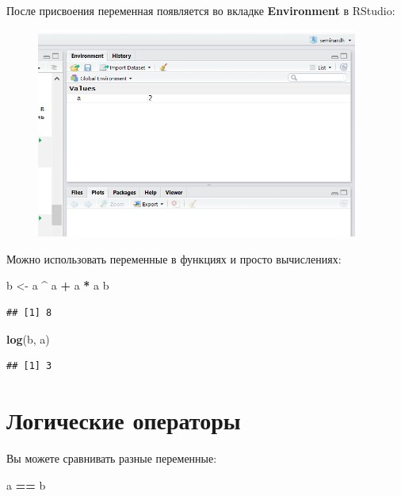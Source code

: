 \documentclass[]{book}
\newenvironment{Shaded}{\begin{snugshade}}{\end{snugshade}}
\newcommand{\KeywordTok}[1]{\textcolor[rgb]{0.13,0.29,0.53}{\textbf{#1}}}
\newcommand{\StringTok}[1]{\textcolor[rgb]{0.31,0.60,0.02}{#1}}
\newcommand{\OperatorTok}[1]{\textcolor[rgb]{0.81,0.36,0.00}{\textbf{#1}}}
\newcommand{\NormalTok}[1]{#1}
\begin{document}
После присвоения переменная появляется во вкладке \textbf{Environment} в
RStudio:

\begin{figure}
\centering
\includegraphics[width=4.16667in]{images/env.png}
\caption{}
\end{figure}

Можно использовать переменные в функциях и просто вычислениях:

\begin{Shaded}
\begin{Highlighting}[]
\NormalTok{b <-}\StringTok{ }\NormalTok{a }\OperatorTok{^}\StringTok{ }\NormalTok{a }\OperatorTok{+}\StringTok{ }\NormalTok{a }\OperatorTok{*}\StringTok{ }\NormalTok{a}
\NormalTok{b}
\end{Highlighting}
\end{Shaded}

\begin{verbatim}
## [1] 8
\end{verbatim}

\begin{Shaded}
\begin{Highlighting}[]
\KeywordTok{log}\NormalTok{(b, a)}
\end{Highlighting}
\end{Shaded}

\begin{verbatim}
## [1] 3
\end{verbatim}

\section{Логические операторы}\label{logic}

Вы можете сравнивать разные переменные:

\begin{Shaded}
\begin{Highlighting}[]
\NormalTok{a }\OperatorTok{==}\StringTok{ }\NormalTok{b}
\end{Highlighting}
\end{Shaded}
\end{document}
